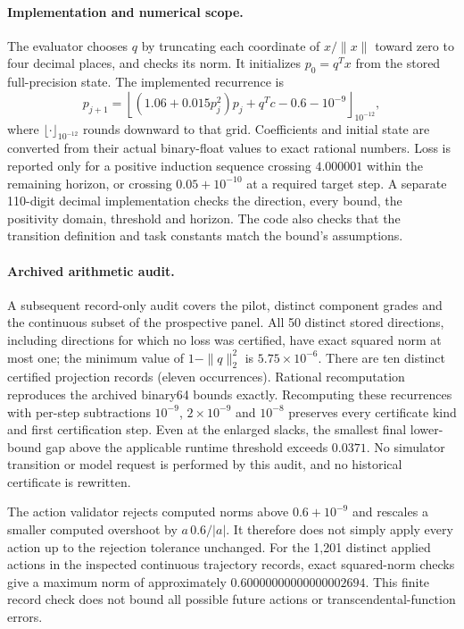 \paragraph{Implementation and numerical scope.}
The evaluator chooses $q$ by truncating each coordinate of $x/\|x\|$ toward zero to four decimal places, and checks its norm. It initializes $p_0=q^Tx$ from the stored full-precision state. The implemented recurrence is
\begin{equation}
p_{j+1}=\left\lfloor (1.06+0.015p_j^2)p_j+q^Tc-0.6-10^{-9}\right\rfloor_{10^{-12}},
\end{equation}
where $\lfloor\cdot\rfloor_{10^{-12}}$ rounds downward to that grid. Coefficients and initial state are converted from their actual binary-float values to exact rational numbers. Loss is reported only for a positive induction sequence crossing $4.000001$ within the remaining horizon, or crossing $0.05+10^{-10}$ at a required target step. A separate 110-digit decimal implementation checks the direction, every bound, the positivity domain, threshold and horizon. The code also checks that the transition definition and task constants match the bound's assumptions.

\paragraph{Archived arithmetic audit.}
A subsequent record-only audit covers the pilot, distinct component
grades and the continuous subset of the prospective panel. All 50 distinct
stored directions, including directions for which no loss was certified,
have exact squared norm at most one; the minimum value of
$1-\|q\|_2^2$ is $5.75\times10^{-6}$. There are ten distinct certified
projection records (eleven occurrences). Rational recomputation reproduces
the archived binary64 bounds exactly. Recomputing these recurrences with per-step
subtractions $10^{-9}$, $2\times10^{-9}$ and $10^{-8}$ preserves every
certificate kind and first certification step. Even at the enlarged
slacks, the smallest final lower-bound gap above the applicable runtime
threshold exceeds $0.0371$. No simulator transition or model request is
performed by this audit, and no historical certificate is rewritten.

The action validator rejects computed norms above $0.6+10^{-9}$ and
rescales a smaller computed overshoot by $a\,0.6/|a|$. It therefore does
not simply apply every action up to the rejection tolerance unchanged.
For the 1,201 distinct applied actions in the inspected continuous
trajectory records, exact squared-norm checks give a maximum norm of
approximately $0.60000000000000002694$. This finite record check does not
bound all possible future actions or transcendental-function errors.

